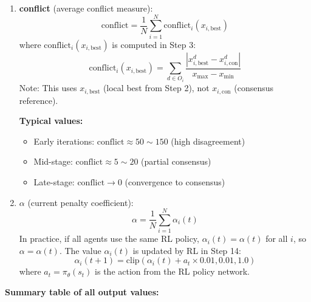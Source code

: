 \documentclass[11pt,a4paper]{article}
\begin{document}
\begin{itemize}
\begin{enumerate}
    \item \textbf{conflict} (average conflict measure):
    \begin{equation}
    \text{conflict} = \frac{1}{N}\sum_{i=1}^N \text{conflict}_i(x_{i,\text{best}})
    \end{equation}
    where $\text{conflict}_i(x_{i,\text{best}})$ is computed in Step 3:
    \begin{equation}
    \text{conflict}_i(x_{i,\text{best}}) = \sum_{d \in O_i} \frac{|x_{i,\text{best}}^d - x_{i,\text{con}}^d|}{x_{\max} - x_{\min}}
    \end{equation}
    Note: This uses $x_{i,\text{best}}$ (local best from Step 2), not $x_{i,\text{con}}$ (consensus reference).
    
    \textbf{Typical values:}
    \begin{itemize}
        \item Early iterations: $\text{conflict} \approx 50 \sim 150$ (high disagreement)
        \item Mid-stage: $\text{conflict} \approx 5 \sim 20$ (partial consensus)
        \item Late-stage: $\text{conflict} \to 0$ (convergence to consensus)
    \end{itemize}
    
    \item \textbf{$\alpha$} (current penalty coefficient):
    \begin{equation}
    \alpha = \frac{1}{N}\sum_{i=1}^N \alpha_i(t)
    \end{equation}
    In practice, if all agents use the same RL policy, $\alpha_i(t) = \alpha(t)$ for all $i$, so $\alpha = \alpha(t)$.
    The value $\alpha_i(t)$ is updated by RL in Step 14:
    \begin{equation}
    \alpha_i(t+1) = \text{clip}(\alpha_i(t) + a_t \times 0.01, 0.01, 1.0)
    \end{equation}
    where $a_t = \pi_\theta(s_t)$ is the action from the RL policy network.
\end{enumerate}

\textbf{Summary table of all output values:}


\end{itemize}
\end{document}

